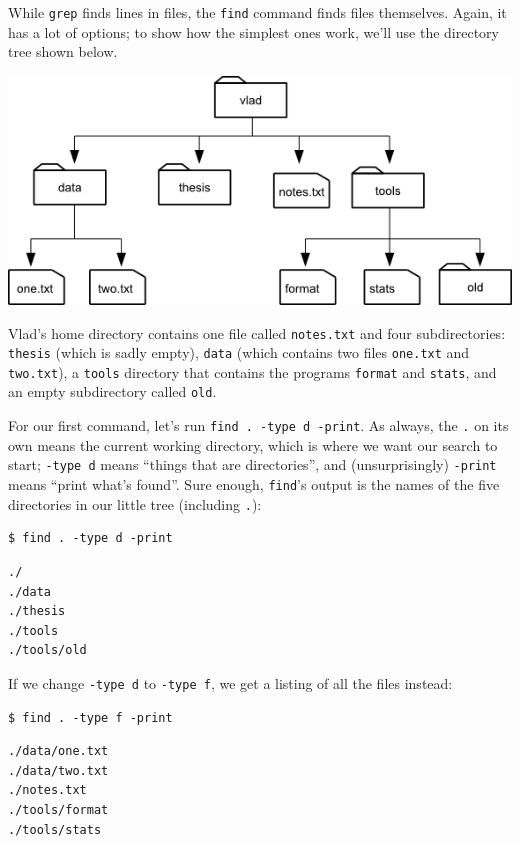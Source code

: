 \documentclass{book}
\begin{document}
While \texttt{grep} finds lines in files, the \texttt{find} command
finds files themselves. Again, it has a lot of options; to show how the
simplest ones work, we'll use the directory tree shown below.

\includegraphics{novice/shell/img/find-file-tree.png}

Vlad's home directory contains one file called \texttt{notes.txt} and
four subdirectories: \texttt{thesis} (which is sadly empty),
\texttt{data} (which contains two files \texttt{one.txt} and
\texttt{two.txt}), a \texttt{tools} directory that contains the programs
\texttt{format} and \texttt{stats}, and an empty subdirectory called
\texttt{old}.

For our first command, let's run \texttt{find . -type d -print}. As
always, the \texttt{.} on its own means the current working directory,
which is where we want our search to start; \texttt{-type d} means
``things that are directories'', and (unsurprisingly) \texttt{-print}
means ``print what's found''. Sure enough, \texttt{find}'s output is the
names of the five directories in our little tree (including \texttt{.}):

\begin{verbatim}
$ find . -type d -print
\end{verbatim}

\begin{verbatim}
./
./data
./thesis
./tools
./tools/old
\end{verbatim}

If we change \texttt{-type d} to \texttt{-type f}, we get a listing of
all the files instead:

\begin{verbatim}
$ find . -type f -print
\end{verbatim}

\begin{verbatim}
./data/one.txt
./data/two.txt
./notes.txt
./tools/format
./tools/stats
\end{verbatim}
\end{document}
